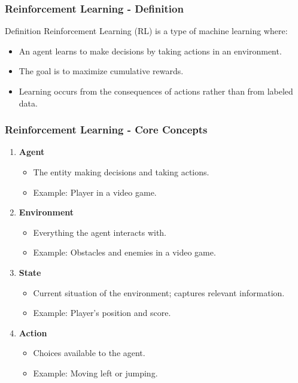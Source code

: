 \documentclass{beamer}
\begin{document}
\begin{frame}[fragile]
    \frametitle{Reinforcement Learning - Definition}
    \begin{block}{Definition}
        Reinforcement Learning (RL) is a type of machine learning where:
        \begin{itemize}
            \item An agent learns to make decisions by taking actions in an environment.
            \item The goal is to maximize cumulative rewards.
            \item Learning occurs from the consequences of actions rather than from labeled data.
        \end{itemize}
    \end{block}
\end{frame}

\begin{frame}[fragile]
    \frametitle{Reinforcement Learning - Core Concepts}
    \begin{enumerate}
        \item \textbf{Agent}
            \begin{itemize}
                \item The entity making decisions and taking actions.
                \item Example: Player in a video game.
            \end{itemize}
        
        \item \textbf{Environment}
            \begin{itemize}
                \item Everything the agent interacts with.
                \item Example: Obstacles and enemies in a video game.
            \end{itemize}
        
        \item \textbf{State}
            \begin{itemize}
                \item Current situation of the environment; captures relevant information.
                \item Example: Player's position and score.
            \end{itemize}
        
        \item \textbf{Action}
            \begin{itemize}
                \item Choices available to the agent.
                \item Example: Moving left or jumping.
            \end{itemize}
    \end{enumerate}
\end{frame}
\end{document}
